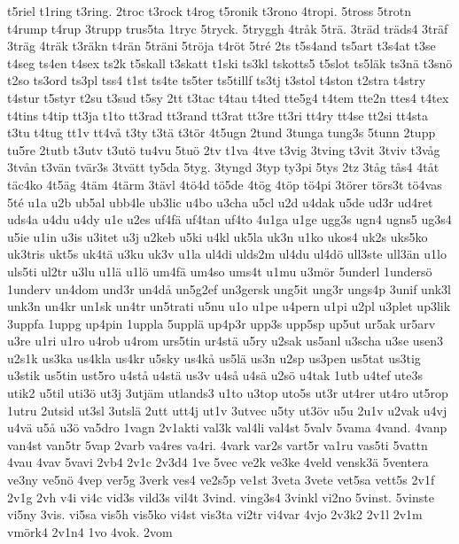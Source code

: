{{t5riel
t1ring
t3ring.
2troc
t3rock
t4rog
t5ronik
t3rono
4tropi.
5tross
5trotn
t4rump
t4rup
3trupp
trus5ta
1tryc
5tryck.
5tryggh
4tr^^e5k
5tr^^e4.
3tr^^e4d
tr^^e4ds4
3tr^^e4f
3tr^^e4g
4tr^^e4k
t3r^^e4kn
t4r^^e4n
5tr^^e4ni
5tr^^f6ja
t4r^^f6t
5tr^^e9
2ts
t5s4and
ts5art
t3s4at
t3se
t4seg
ts4en
t4sex
ts2k
t5skall
t3skatt
t1ski
ts3kl
tskotts5
t5slot
ts5l^^e4k
ts3n^^e4
t3sn^^f6
t2so
ts3ord
ts3pl
tss4
t1st
ts4te
ts5ter
ts5tillf
ts3tj
t3stol
t4ston
t2stra
t4stry
t4stur
t5styr
t2su
t3sud
t5sy
2tt
t3tac
t4tau
t4ted
tte5g4
t4tem
tte2n
ttes4
t4tex
t4tins
t4tip
tt3ja
t1to
tt3rad
tt3rand
tt3rat
tt3re
tt3ri
tt4ry
tt4se
tt2si
tt4sta
t3tu
t4tug
tt1v
tt4v^^e5
t3ty
t3t^^e4
t3t^^f6r
4t5ugn
2tund
3tunga
tung3s
5tunn
2tupp
tu5re
2tutb
t3utv
t3ut^^f6
tu4vu
5tu^^f6
2tv
t1va
4tve
t3vig
3tving
t3vit
3tviv
t3v^^e5g
3tv^^e5n
t3v^^e4n
tv^^e4r3s
3tv^^e4tt
ty5da
5tyg.
3tyngd
3typ
ty3pi
5tys
2tz
3t^^e5g
t^^e5s4
4t^^e5t
t^^e4c4ko
4t5^^e4g
4t^^e4m
4t^^e4rm
3t^^e4vl
4t^^f64d
t^^f65de
4t^^f6g
4t^^f6p
t^^f64pi
3t^^f6rer
t^^f6rs3t
t^^f64vas
5t^^e9
u1a
u2b
ub5al
ubb4le
ub3lic
u4bo
u3cha
u5cl
u2d
u4dak
u5de
ud3r
ud4ret
uds4a
u4du
u4dy
u1e
u2es
uf4f^^e4
uf4tan
uf4to
4u1ga
u1ge
ugg3s
ugn4
ugns5
ug3s4
u5ie
u1in
u3is
u3itet
u3j
u2keb
u5ki
u4kl
uk5la
uk3n
u1ko
ukos4
uk2s
uks5ko
uk3tris
ukt5s
uk4t^^e4
u3ku
uk3v
u1la
ul4di
ulds2m
ul4du
ul4d^^f6
ull3ste
ull3^^e4n
u1lo
uls5ti
ul2tr
u3lu
u1l^^e4
u1l^^f6
um4f^^e4
um4so
ums4t
u1mu
u3m^^f6r
5underl
1unders^^f6
1underv
un4dom
und3r
un4d^^e5
un5g2ef
un3gersk
ung5it
ung3r
ungs4p
3unif
unk3l
unk3n
un4kr
un1sk
un4tr
un5trati
u5nu
u1o
u1pe
u4pern
u1pi
u2pl
u3plet
up3lik
3uppfa
1uppg
up4pin
1uppla
5uppl^^e4
up4p3r
upp3s
upp5sp
up5ut
ur5ak
ur5arv
u3re
u1ri
u1ro
u4rob
u4rom
urs5tin
ur4st^^e4
u5ry
u2sak
us5anl
u3scha
u3se
usen3
u2s1k
us3ka
us4kla
us4kr
u5sky
us4k^^e5
us5l^^e4
us3n
u2sp
us3pen
us5tat
us3tig
u3stik
us5tin
ust5ro
u4st^^e5
u4st^^e4
us3v
u4s^^e5
u4s^^e4
u2s^^f6
u4tak
1utb
u4tef
ute3s
utik2
u5til
uti3^^f6
ut3j
3utj^^e4m
utlands3
u1to
u3top
uto5s
ut3r
ut4rer
ut4ro
ut5rop
1utru
2utsid
ut3sl
3utsl^^e4
2utt
utt4j
ut1v
3utvec
u5ty
ut3^^f6v
u5u
2u1v
u2vak
u4vj
u4v^^e4
u5^^e5
u3^^f6
va5dro
1vagn
2v1akti
val3k
val4li
val4st
5valv
5vama
4vand.
4vanp
van4st
van5tr
5vap
2varb
va4res
va4ri.
4vark
var2s
vart5r
va1ru
vas5ti
5vattn
4vau
4vav
5vavi
2vb4
2v1c
2v3d4
1ve
5vec
ve2k
ve3ke
4veld
vensk3^^e4
5ventera
ve3ny
ve5n^^f6
4vep
ver5g
3verk
ves4
ve2s5p
ve1st
3veta
3vete
vet5sa
vett5s
2v1f
2v1g
2vh
v4i
vi4c
vid3s
vild3s
vil4t
3vind.
ving3s4
3vinkl
vi2no
5vinst.
5vinste
vi5ny
3vis.
vi5sa
vis5h
vis5ko
vi4st
vis3ta
vi2tr
vi4var
4vjo
2v3k2
2v1l
2v1m
vm^^f6rk4
2v1n4
1vo
4vok.
2vom
}}
